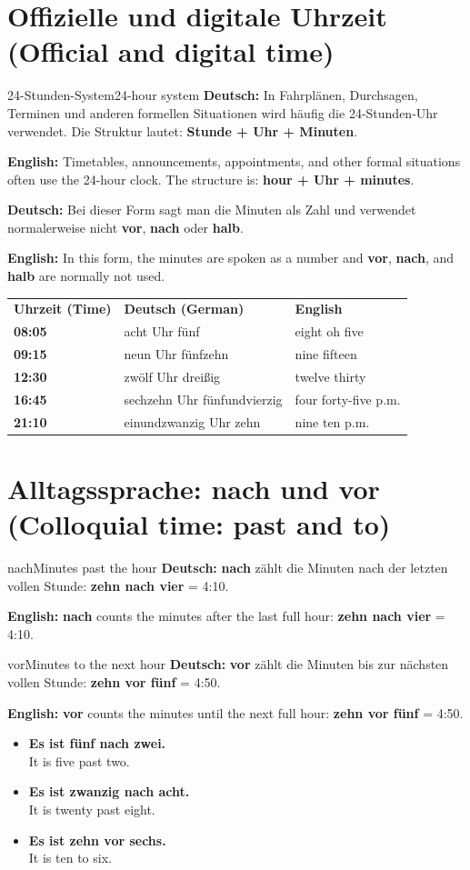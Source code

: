 \documentclass[a4paper,11pt]{article}
\newcommand{\GermanText}[1]{\textbf{Deutsch: }#1\par}
\newcommand{\EnglishText}[1]{{\small\color{SoftGray}\textbf{English: }#1\par}}
\newcommand{\ExampleItem}[2]{\item \textbf{#1}\\{\small\color{SoftGray}#2}}
\begin{document}
\section{Offizielle und digitale Uhrzeit \textnormal{(Official and digital time)}}
\begin{grammarentry}{24-Stunden-System}{24-hour system}
\GermanText{In Fahrplänen, Durchsagen, Terminen und anderen formellen Situationen wird häufig die 24-Stunden-Uhr verwendet. Die Struktur lautet: \textbf{Stunde + Uhr + Minuten}.}
\EnglishText{Timetables, announcements, appointments, and other formal situations often use the 24-hour clock. The structure is: \textbf{hour + Uhr + minutes}.}
\GermanText{Bei dieser Form sagt man die Minuten als Zahl und verwendet normalerweise nicht \textbf{vor}, \textbf{nach} oder \textbf{halb}.}
\EnglishText{In this form, the minutes are spoken as a number and \textbf{vor}, \textbf{nach}, and \textbf{halb} are normally not used.}
\end{grammarentry}
\begin{longtable}{>{\bfseries}p{2.7cm}|p{5cm}|p{6cm}}
\rowcolor{HeaderBlueDark}\color{white}\textbf{Uhrzeit (Time)}&\color{white}\textbf{Deutsch (German)}&\color{white}\textbf{English}\\
08:05 & acht Uhr fünf & eight oh five \\
09:15 & neun Uhr fünfzehn & nine fifteen \\
12:30 & zwölf Uhr dreißig & twelve thirty \\
16:45 & sechzehn Uhr fünfundvierzig & four forty-five p.m. \\
21:10 & einundzwanzig Uhr zehn & nine ten p.m. \\
\end{longtable}
\section{Alltagssprache: nach und vor \textnormal{(Colloquial time: past and to)}}
\begin{grammarentry}{nach}{Minutes past the hour}
\GermanText{\textbf{nach} zählt die Minuten nach der letzten vollen Stunde: \textbf{zehn nach vier} = 4:10.}
\EnglishText{\textbf{nach} counts the minutes after the last full hour: \textbf{zehn nach vier} = 4:10.}
\end{grammarentry}
\begin{grammarentry}{vor}{Minutes to the next hour}
\GermanText{\textbf{vor} zählt die Minuten bis zur nächsten vollen Stunde: \textbf{zehn vor fünf} = 4:50.}
\EnglishText{\textbf{vor} counts the minutes until the next full hour: \textbf{zehn vor fünf} = 4:50.}
\end{grammarentry}
\begin{exbox}\begin{itemize}
\ExampleItem{Es ist fünf nach zwei.}{It is five past two.}
\ExampleItem{Es ist zwanzig nach acht.}{It is twenty past eight.}
\ExampleItem{Es ist zehn vor sechs.}{It is ten to six.}
\end{itemize}\end{exbox}
\end{document}
